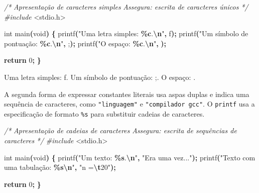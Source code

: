 \documentclass[
  11pt,
  a4paper,
]{scrbook}
\newenvironment{Shaded}{\begin{snugshade}}{\end{snugshade}}
\newcommand{\CharTok}[1]{\textcolor[rgb]{0.31,0.60,0.02}{#1}}
\newcommand{\CommentTok}[1]{\textcolor[rgb]{0.56,0.35,0.01}{\textit{#1}}}
\newcommand{\ControlFlowTok}[1]{\textcolor[rgb]{0.13,0.29,0.53}{\textbf{#1}}}
\newcommand{\DataTypeTok}[1]{\textcolor[rgb]{0.13,0.29,0.53}{#1}}
\newcommand{\DecValTok}[1]{\textcolor[rgb]{0.00,0.00,0.81}{#1}}
\newcommand{\ImportTok}[1]{#1}
\newcommand{\NormalTok}[1]{#1}
\newcommand{\OperatorTok}[1]{\textcolor[rgb]{0.81,0.36,0.00}{\textbf{#1}}}
\newcommand{\PreprocessorTok}[1]{\textcolor[rgb]{0.56,0.35,0.01}{\textit{#1}}}
\newcommand{\SpecialCharTok}[1]{\textcolor[rgb]{0.81,0.36,0.00}{\textbf{#1}}}
\newcommand{\StringTok}[1]{\textcolor[rgb]{0.31,0.60,0.02}{#1}}
\begin{document}
\begin{Shaded}
\begin{Highlighting}[]
\CommentTok{/*}
\CommentTok{Apresentação de caracteres simples}
\CommentTok{Assegura: escrita de caracteres únicos}
\CommentTok{*/}
\PreprocessorTok{\#include }\ImportTok{\textless{}stdio.h\textgreater{}}

\DataTypeTok{int}\NormalTok{ main}\OperatorTok{(}\DataTypeTok{void}\OperatorTok{)} \OperatorTok{\{}
\NormalTok{    printf}\OperatorTok{(}\StringTok{"Uma letra simples: }\SpecialCharTok{\%c}\StringTok{.}\SpecialCharTok{\textbackslash{}n}\StringTok{"}\OperatorTok{,} \CharTok{\textquotesingle{}f\textquotesingle{}}\OperatorTok{);}
\NormalTok{    printf}\OperatorTok{(}\StringTok{"Um símbolo de pontuação: }\SpecialCharTok{\%c}\StringTok{.}\SpecialCharTok{\textbackslash{}n}\StringTok{"}\OperatorTok{,} \CharTok{\textquotesingle{};\textquotesingle{}}\OperatorTok{);}
\NormalTok{    printf}\OperatorTok{(}\StringTok{"O espaço: }\SpecialCharTok{\%c}\StringTok{.}\SpecialCharTok{\textbackslash{}n}\StringTok{"}\OperatorTok{,} \CharTok{\textquotesingle{} \textquotesingle{}}\OperatorTok{);}

    \ControlFlowTok{return} \DecValTok{0}\OperatorTok{;}
\OperatorTok{\}}
\end{Highlighting}
\end{Shaded}

\begin{Shaded}
\begin{Highlighting}[]
\NormalTok{Uma letra simples: f.}
\NormalTok{Um símbolo de pontuação: ;.}
\NormalTok{O espaço:  .}
\end{Highlighting}
\end{Shaded}

A segunda forma de expressar constantes literais usa aspas duplas e
indica uma sequência de caracteres, como \texttt{"linguagem"} e
\texttt{"compilador\ gcc"}. O \texttt{printf} usa a especificação de
formato \texttt{\%s} para substituir cadeias de caracteres.

\begin{Shaded}
\begin{Highlighting}[]
\CommentTok{/*}
\CommentTok{Apresentação de cadeias de caracteres}
\CommentTok{Assegura: escrita de sequências de caracteres}
\CommentTok{*/}
\PreprocessorTok{\#include }\ImportTok{\textless{}stdio.h\textgreater{}}

\DataTypeTok{int}\NormalTok{ main}\OperatorTok{(}\DataTypeTok{void}\OperatorTok{)} \OperatorTok{\{}
\NormalTok{    printf}\OperatorTok{(}\StringTok{"Um texto: }\SpecialCharTok{\%s}\StringTok{.}\SpecialCharTok{\textbackslash{}n}\StringTok{"}\OperatorTok{,} \StringTok{"Era uma vez..."}\OperatorTok{);}
\NormalTok{    printf}\OperatorTok{(}\StringTok{"Texto com uma tabulação: }\SpecialCharTok{\%s\textbackslash{}n}\StringTok{"}\OperatorTok{,} \StringTok{"n =}\SpecialCharTok{\textbackslash{}t}\StringTok{20"}\OperatorTok{);}

    \ControlFlowTok{return} \DecValTok{0}\OperatorTok{;}
\OperatorTok{\}}
\end{Highlighting}
\end{Shaded}
\end{document}

